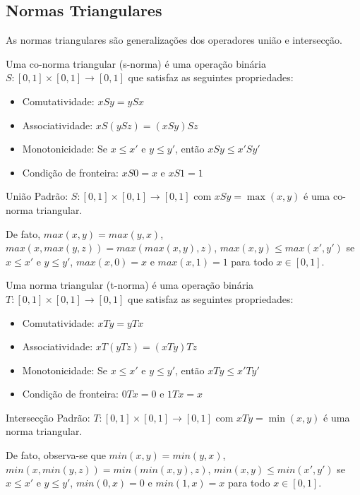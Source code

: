 \subsection{Normas Triangulares}
As normas triangulares são generalizações dos operadores união e intersecção.

\begin{definicao}
Uma co-norma triangular (s-norma) é uma operação binária $S: [0, 1] \times [0, 1] \rightarrow [0, 1]$ que satisfaz as seguintes propriedades:
\begin{itemize}
    \item Comutatividade: $xSy = ySx$
    \item Associatividade: $xS(ySz) = (xSy)Sz$
    \item Monotonicidade: Se $x \leq x'$ e $y \leq y'$, então $xSy \leq x'Sy'$
    \item Condição de fronteira: $xS0 = x$ e $xS1 = 1$
\end{itemize}
\end{definicao}

\begin{exemplo}
    União Padrão: $S: [0,1] \times [0,1] \to [0,1]$ com $xSy = \max(x, y)$ é uma co-norma triangular. 
\end{exemplo}
    De fato, $max(x,y) = max(y,x)$, $max(x, max(y,z)) = max(max(x,y), z)$, $max(x,y) \leq max(x',y')$ se $x \leq x'$ e $y \leq y'$, $max(x,0) = x$ e $max(x,1) = 1$ para todo $x \in [0,1]$.

\begin{definicao}
Uma norma triangular (t-norma) é uma operação binária $T: [0, 1] \times [0, 1] \rightarrow [0, 1]$ que satisfaz as seguintes propriedades:
\begin{itemize}
    \item Comutatividade: $xTy = yTx$
    \item Associatividade: $xT(yTz) = (xTy)Tz$
    \item Monotonicidade: Se $x \leq x'$ e $y \leq y'$, então $xTy \leq x'Ty'$
    \item Condição de fronteira: $0Tx = 0$ e $1Tx = x$
\end{itemize}
\end{definicao}
\begin{exemplo}
    Intersecção Padrão: $T: [0,1] \times [0,1] \to [0,1]$ com $xTy = \min(x,y)$ é uma norma triangular.
\end{exemplo}
De fato, observa-se que $min(x,y) = min(y,x)$, $min(x, min(y,z)) = min(min(x,y), z)$, $min(x,y) \leq  min(x',y')$ se $x \leq x'$ e $y \leq y'$, $min(0,x) = 0$ e $min(1,x) = x$ para todo $x \in [0,1]$.


